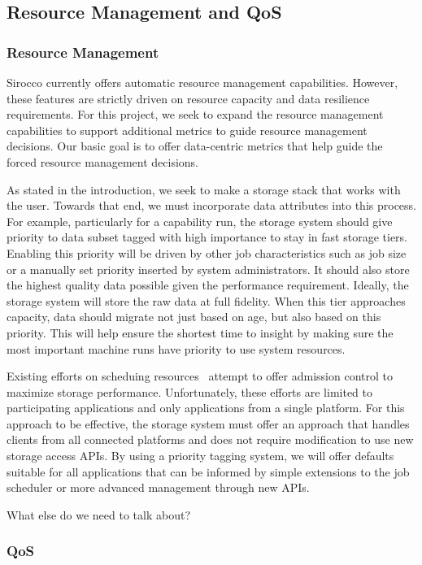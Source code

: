 \subsection{Resource Management and QoS}

\subsubsection{Resource Management}
Sirocco currently offers automatic resource management capabilities. However,
these features are strictly driven on resource capacity and data resilience
requirements. For this project, we seek to expand the resource management
capabilities to support additional metrics to guide resource management
decisions. Our basic goal is to offer data-centric metrics that help guide the
forced resource management decisions.

As stated in the introduction, we seek to make a storage stack that works with
the user. Towards that end, we must incorporate data attributes into this
process. For example, particularly for a capability run, the storage system
should give priority to data subset tagged with high importance to stay in fast
storage tiers. Enabling this priority will be driven by other job
characteristics such as job size or a manually set priority inserted by system
administrators. It should also store the highest quality data possible given
the performance requirement. Ideally, the storage system will store the raw
data at full fidelity. When this tier approaches capacity, data should migrate
not just based on age, but also based on this priority. This will help ensure
the shortest time to insight by making sure the most important machine runs
have priority to use system resources.

Existing efforts on scheduing resources~\cite{io-cop,dorier} attempt to offer
admission control to maximize storage performance. Unfortunately, these efforts
are limited to participating applications and only applications from a single
platform. For this approach to be effective, the storage system must offer an
approach that handles clients from all connected platforms and does not
require modification to use new storage access APIs. By using a priority
tagging system, we will offer defaults suitable for all applications that can
be informed by simple extensions to the job scheduler or more advanced
management through new APIs.

What else do we need to talk about?

\subsubsection{QoS}

